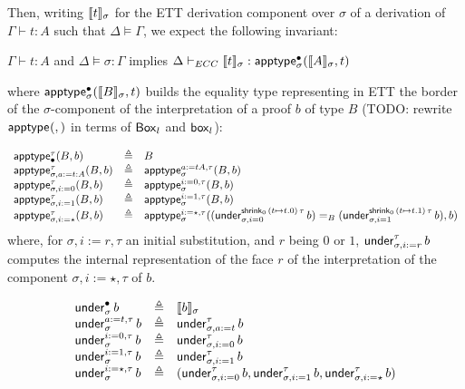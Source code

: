 \documentclass{article}
\newcommand{\defeq}{\triangleq}
\begin{document}

Then, writing $\llbracket t \rrbracket_{\sigma}$ for the ETT derivation component
over $\sigma$ of a derivation of $\Gamma \vdash t : A$ such that
$\Delta \vDash \Gamma$, we expect the following invariant:

\begin{lemma}
$\Gamma \vdash t : A$ and $\Delta \vDash \sigma : \Gamma$ implies
$\Delta \vdash_{ECC} \llbracket t \rrbracket_{\sigma} : \mathsf{apptype}_{\sigma}^{\bullet}(\llbracket A \rrbracket_{\sigma},t)$
\end{lemma}
where $\mathsf{apptype}_{\sigma}^{\bullet}(\llbracket B \rrbracket_{\sigma},t)$ builds
the equality type representing in ETT the border of the
$\sigma$-component of the interpretation of a proof $b$ of type $B$ (TODO: rewrite $\mathsf{apptype}_{}^{}(,)$ in terms of $\mathsf{Box}_{l}$ and $\mathsf{box}_{l}$):

$$
\begin{array}{lcll}
\applytype{\emptysigma}{\tau}{B}{b} & \defeq & B\\
\applytype{\sigma,a:=t:A}{\tau}{B}{b} & \defeq & \applytype{\sigma}{a:=tA,\tau}{B}{b}\\
\applytype{\sigma,i:=0}{\tau}{B}{b} & \defeq & \applytype{\sigma}{i:=0,\tau}{B}{b}\\
\applytype{\sigma,i:=1}{\tau}{B}{b} & \defeq & \applytype{\sigma}{i:=1,\tau}{B}{b}\\
\applytype{\sigma,i:=\star}{\tau}{B}{b} & \defeq & \applytype{\sigma}{i:=\star,\tau}{(\undertau{\sigma,i=0}{\shrink{0}{(t\mapsto t.0)}{\tau}}{b}) =_B (\undertau{\sigma,i=1}{\shrink{0}{(t\mapsto t.1)}{\tau}}{b})}{b}
\end{array}
$$
where, for $\sigma,i:=r,\tau$ an initial substitution, and $r$ being
$0$ or $1$, $\mathsf{under}_{\sigma,i:=r}^{\tau}\,b$ computes the internal
representation of the face $r$ of the interpretation of the component
$\sigma,i:=\star,\tau$ of $b$.

$$
\begin{array}{lcll}
\undertau{\sigma}{\emptysigma}{b} & \defeq & \semnew{\sigma}{b} \\
\undertau{\sigma}{a:=t,\tau}{b} & \defeq & \undertau{\sigma,a:=t}{\tau}{b}\\
\undertau{\sigma}{i:=0,\tau}{b} & \defeq & \undertau{\sigma,i:=0}{\tau}{b} \\
\undertau{\sigma}{i:=1,\tau}{b} & \defeq & \undertau{\sigma,i:=1}{\tau}{b} \\
\undertau{\sigma}{i:=\star,\tau}{b} & \defeq & (\undertau{\sigma,i:=0}{\tau}{b},\undertau{\sigma,i:=1}{\tau}{b},\undertau{\sigma,i:=\star}{\tau}{b})\\
\end{array}
$$
\end{document}
